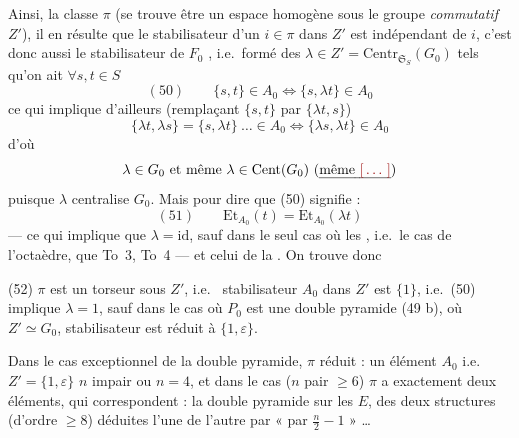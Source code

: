 \documentclass[11pt,a4paper]{article}
\begin{document}
Ainsi, la classe $\pi$ (se trouve être un espace
homogène sous le groupe \emph{commutatif} $Z'$),
il en résulte que le stabilisateur d'un $i\in\pi$
dans $Z'$ est indépendant de $i$, c'est donc aussi
le stabilisateur de $F_0$ , i.e.\ formé des
$\lambda\in Z'=\mathrm{Centr}_{\mathfrak{S}_S}(G_0)$ tels qu'on ait $\forall s,t\in S$
\[
(50)\qquad \{s,t\}\in A_0 \Longleftrightarrow \{s,\lambda t\}\in A_0
\]
ce qui implique d'ailleurs (remplaçant $\{s,t\}$ par $\{\lambda t,s\}$)
\[
\{\lambda t,\lambda s\}=\{s,\lambda t\}\ \ldots\in A_0 \Longleftrightarrow \{\lambda s,\lambda t\}\in A_0
\]
d'où
\[
\lambda\in G_0 \text{ et même } \lambda\in\mathrm{Cent}(G_0)\ (\text{\uncertain{même \ill{}}})
\]
puisque $\lambda$ centralise $G_0$. \struck{\ill{}} Mais \ill{} pour dire que (50)
signifie \ill{} :
\[
(51)\qquad \mathrm{Et}_{A_0}(t)=\mathrm{Et}_{A_0}(\lambda t)
\]
— ce qui implique que $\lambda=\mathrm{id}$, sauf dans le seul cas où 
 les , i.e.\ le cas  de
l'octaèdre,   \ill{} que To~3, To~4 — et
celui de la . On trouve donc


(52) \struck{\ill{}} $\pi$ est un torseur sous $Z'$, i.e.\  stabilisateur
\struck{\ill{}} $A_0$ dans $Z'$ est $\{1\}$, i.e.\ (50) implique
$\lambda=1$, sauf dans le cas  où $P_0$ est une
double pyramide (49 b), où \ill{} $Z'\simeq G_0$, \struck{\ill{}}
 stabilisateur est réduit à $\{1,\varepsilon\}$. \struck{\ill{}}

Dans le cas exceptionnel de la double
pyramide, \ill{} \ill{} $\pi$ réduit : un élément $A_0$
\struck{\ill{}} i.e.\ $Z'=\{1,\varepsilon\}$ \ill{} $n$ impair ou $n=4$,
et dans le cas  ($n$ pair $\geqslant 6$) $\pi$ a exactement
deux éléments, qui correspondent
: la double pyramide sur les \ill{} 
$E$,  des deux structures 
 (d'ordre   $\geqslant 8$) déduites l'une
de l'autre par «  par $\frac{n}{2}-1$ » …
\end{document}

